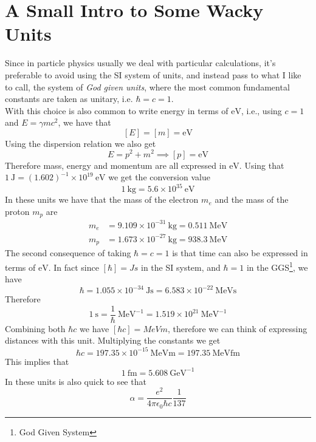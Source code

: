 \documentclass[../qm.tex]{subfiles}
\begin{document}
\section{A Small Intro to Some Wacky Units}
Since in particle physics usually we deal with particular calculations, it's preferable to avoid using the SI system of units, and instead pass to what I like to call, the system of \emph{God given units}, where the most common fundamental constants are taken as unitary, i.e. $\hbar=c=1$.\\
With this choice is also common to write energy in terms of $\mathrm{eV}$, i.e., using $c=1$ and $E=\gamma mc^2$, we have that
\begin{equation*}
	\left[ E \right]=\left[ m \right]=\mathrm{eV}
\end{equation*}
Using the dispersion relation we also get
\begin{equation*}
	E=p^2+m^2\implies{}\left[ p \right]=\mathrm{eV}
\end{equation*}
Therefore mass, energy and momentum are all expressed in $\mathrm{eV}$. Using that $1\ \mathrm{J}=(1.602)^{-1}\times 10^{19}\ \mathrm{eV}$ we get the conversion value
\begin{equation}
	1\ \mathrm{kg}=5.6\times 10^{35}\ \mathrm{eV}
	\label{eq:kgtoevconv}
\end{equation}
In these units we have that the mass of the electron $m_e$ and the mass of the proton $m_p$ are
\begin{equation}
	\begin{aligned}
		m_e&=9.109\times 10^{-31}\ \mathrm{kg}=0.511\ \mathrm{MeV}\\
		m_p&=1.673\times 10^{-27}\ \mathrm{kg}=938.3\ \mathrm{MeV}
	\end{aligned}
	\label{eq:massemassprot}
\end{equation}
The second consequence of taking $\hbar=c=1$ is that time can also be expressed in terms of $\mathrm{eV}$. In fact since $\left[ \hbar \right]=Js$ in the SI system, and $\hbar=1$ in the GGS\footnote{God Given System}, we have
\begin{equation*}
	\hbar=1.055\times10^{-34}\ \mathrm{Js}=6.583\times 10^{-22}\ \mathrm{MeVs}
\end{equation*}
Therefore
\begin{equation}
	1\ \mathrm{s}=\frac{1}{\hbar}\ \mathrm{MeV^{-1}}=1.519\times10^{21}\ \mathrm{MeV^{-1}}
	\label{eq:sinvmev}
\end{equation}
Combining both $\hbar c$ we have $\left[ \hbar c \right]=MeV m$, therefore we can think of expressing distances with this unit. Multiplying the constants we get
\begin{equation*}
	\hbar c=197.35\times10^{-15}\ \mathrm{MeV m}=197.35\ \mathrm{MeV fm}
\end{equation*}
This implies that
\begin{equation}
	1\ \mathrm{fm}=5.608\ \mathrm{GeV^{-1}}
	\label{eq:fmtogev}
\end{equation}
In these units is also quick to see that
\begin{equation}
	\alpha=\frac{e^2}{4\pi\epsilon_0\hbar c}\frac{1}{137}
	\label{eq:alphaconst}
\end{equation}
\end{document}
